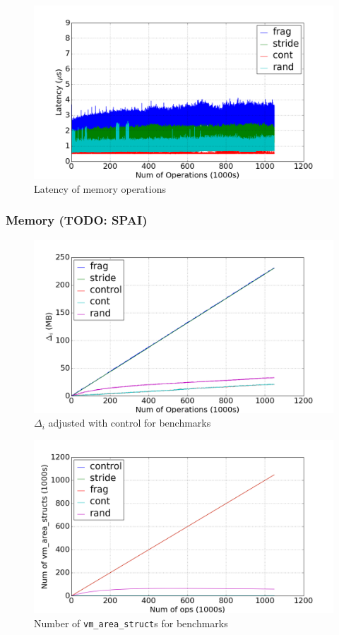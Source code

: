 \documentclass[twocolumn,11pt]{article}
\begin{document}
\begin{figure}
    \includegraphics[width=\columnwidth]{figures/mmap_latency}
    \caption{Latency of memory operations}
    \label{fig:mmap_latency}
\end{figure}

\subsubsection{Memory (TODO: SPAI)}
\begin{figure}
    \includegraphics[width=\columnwidth]{figures/mmap_mem_usage}
    \caption{$\Delta_i$ adjusted with control for benchmarks}
\end{figure}

\begin{figure}
    \includegraphics[width=\columnwidth]{figures/vm_area_struct_count}
    \caption{Number of \texttt{vm\_area\_struct}s for benchmarks}
\end{figure}
\end{document}
